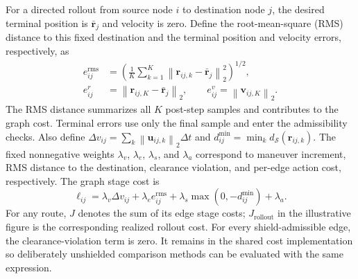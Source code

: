 \documentclass{IEEEtaes}
\newcommand{\dt}{\Delta t}
\newcommand{\norm}[1]{\left\lVert #1 \right\rVert}
\begin{document}
For a directed rollout from source node $i$ to destination node $j$, the desired terminal position is $\bar{\mathbf r}_j$ and velocity is zero. Define the root-mean-square (RMS) distance to this fixed destination and the terminal position and velocity errors, respectively, as
\begin{equation}
  \begin{aligned}
  e_{ij}^{\mathrm{rms}}&=\left(\frac{1}{K}\sum_{k=1}^{K}\norm{\mathbf r_{ij,k}-\bar{\mathbf r}_j}_2^2\right)^{1/2},\\
  e_{ij}^{r}&=\norm{\mathbf r_{ij,K}-\bar{\mathbf r}_j}_2,\qquad
  e_{ij}^{v}=\norm{\mathbf v_{ij,K}}_2.
  \end{aligned}
  \label{eq:edge-errors}
\end{equation}
The RMS distance summarizes all $K$ post-step samples and contributes to the graph cost. Terminal errors use only the final sample and enter the admissibility checks.
Also define $\Delta v_{ij}=\sum_k\norm{\mathbf u_{ij,k}}_2\dt$ and $d_{ij}^{\min}=\min_k d_{\mathcal S}(\mathbf r_{ij,k})$. The fixed nonnegative weights $\lambda_v$, $\lambda_e$, $\lambda_s$, and $\lambda_a$ correspond to maneuver increment, RMS distance to the destination, clearance violation, and per-edge action cost, respectively. The graph stage cost is
\begin{equation}
  \ell_{ij}=\lambda_v\Delta v_{ij}+\lambda_e e_{ij}^{\mathrm{rms}}+\lambda_s\max(0,-d_{ij}^{\min})+\lambda_a.
  \label{eq:edge-cost}
\end{equation}
For any route, $J$ denotes the sum of its edge stage costs; $J_{\mathrm{rollout}}$ in the illustrative figure is the corresponding realized rollout cost.
For every shield-admissible edge, the clearance-violation term is zero. It remains in the shared cost implementation so deliberately unshielded comparison methods can be evaluated with the same expression.
\end{document}
